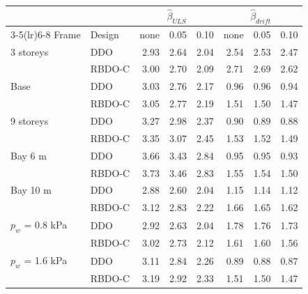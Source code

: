 \begin{tabular}{llrrrrrr}
\toprule
 & & \multicolumn{3}{c}{$\hat\beta_{ULS}$} & \multicolumn{3}{c}{$\hat\beta_{drift}$} \\
\cmidrule(lr){3-5}\cmidrule(lr){6-8}
Frame & Design & none & 0.05 & 0.10 & none & 0.05 & 0.10 \\
\midrule
3 storeys & DDO & 2.93 & 2.64 & 2.04 & 2.54 & 2.53 & 2.47 \\
 & RBDO-C & 3.00 & 2.70 & 2.09 & 2.71 & 2.69 & 2.62 \\
Base & DDO & 3.03 & 2.76 & 2.17 & 0.96 & 0.96 & 0.94 \\
 & RBDO-C & 3.05 & 2.77 & 2.19 & 1.51 & 1.50 & 1.47 \\
9 storeys & DDO & 3.27 & 2.98 & 2.37 & 0.90 & 0.89 & 0.88 \\
 & RBDO-C & 3.35 & 3.07 & 2.45 & 1.53 & 1.52 & 1.49 \\
Bay 6 m & DDO & 3.66 & 3.43 & 2.84 & 0.95 & 0.95 & 0.93 \\
 & RBDO-C & 3.73 & 3.46 & 2.83 & 1.55 & 1.54 & 1.50 \\
Bay 10 m & DDO & 2.88 & 2.60 & 2.04 & 1.15 & 1.14 & 1.12 \\
 & RBDO-C & 3.12 & 2.83 & 2.22 & 1.66 & 1.65 & 1.62 \\
$p_w$ = 0.8 kPa & DDO & 2.92 & 2.63 & 2.04 & 1.78 & 1.76 & 1.73 \\
 & RBDO-C & 3.02 & 2.73 & 2.12 & 1.61 & 1.60 & 1.56 \\
$p_w$ = 1.6 kPa & DDO & 3.11 & 2.84 & 2.26 & 0.89 & 0.88 & 0.87 \\
 & RBDO-C & 3.19 & 2.92 & 2.33 & 1.51 & 1.50 & 1.47 \\
\bottomrule
\end{tabular}